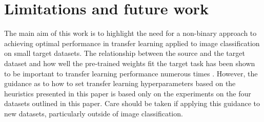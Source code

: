\documentclass[]{article}
\begin{document}
\section{Limitations and future work \label{limitations}}
The main aim of this work is to highlight the need for a non-binary approach to achieving optimal performance in transfer learning applied to image classification on small target datasets. The relationship between the source and the target dataset and how well the pre-trained weights fit the target task has been shown to be important to transfer learning performance numerous times \cite{ngiam2018domain,mahajan2018exploring,cui2018large,ge2017borrowing,sabatelli2018deep,li2018explicit,li2019delta,wan2019towards,ng2015deep,zoph2020rethinking,li2020rethinking}. However, the guidance as to how to set transfer learning hyperparameters based on the heuristics presented in this paper is based only on the experiments on the four datasets outlined in this paper. Care should be taken if applying this guidance to new datasets, particularly outside of image classification.



\end{document}
